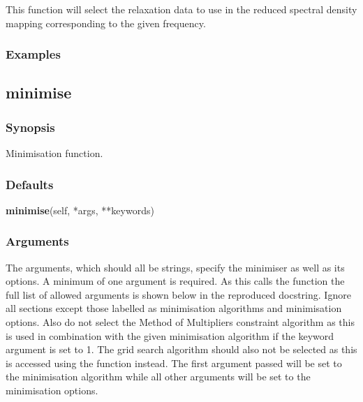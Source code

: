 This function will select the relaxation  data to use in the reduced spectral density mapping 
corresponding to the given frequency.


\subsubsection{Examples}





\newpage

\subsection{minimise}


\subsubsection{Synopsis}

Minimisation function.

\subsubsection{Defaults}

\textsf{\textbf{minimise}(self, *args, **keywords)}


\subsubsection{Arguments}

The arguments, which should all be strings, specify the minimiser  as well as its options.  A
minimum of one argument is required.  As this calls the function 
 the full
list of allowed arguments is shown below in the reproduced 
 docstring.
Ignore all sections except those labelled as minimisation  algorithms and minimisation 
options.  Also do not select the Method of Multipliers  constraint  algorithm as this is used
in combination with the given minimisation  algorithm if the keyword argument 
is set to 1.  The grid search algorithm should also not be selected as this is accessed
using the 
 function instead.  The first argument passed will be set to the
minimisation  algorithm while all other arguments will be set to the minimisation  options.

